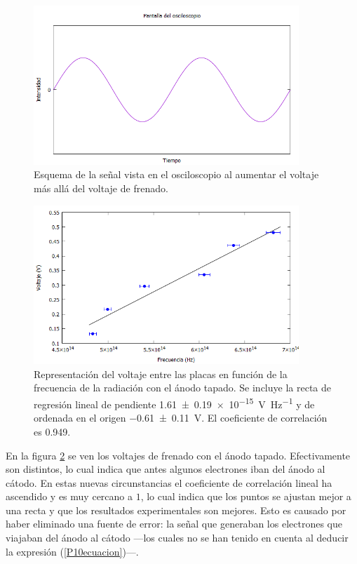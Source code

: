 \documentclass[12pt]{article}
\numberwithin{table}{section}
\numberwithin{figure}{section}
\numberwithin{equation}{section}
\newcommand{\data}[3]{\SI{#1 \pm #2}{#3}}
\begin{document}
\begin{figure}[!ht]
	\begin{center}
		\includegraphics[width=10cm]{P10Sinusoide.png}
		\caption{Esquema de la señal vista en el osciloscopio al aumentar el voltaje más allá del voltaje de frenado.}
		\label{P10sinusoide}
	\end{center}
\end{figure}
\begin{figure}[!ht]
	\begin{center}
		\includegraphics[width=10cm]{P10Anodotapado.png}
		\caption{Representación del voltaje entre las placas en función de la frecuencia de la radiación con el ánodo tapado. Se incluye la recta de regresión lineal de pendiente \data{1.61}{0.19e-15}{V Hz^{-1}} y de ordenada en el origen \data{-0.61}{0.11}{V}. El coeficiente de correlación es \num{0.949}.}
		\label{P10anodotapado}
	\end{center}
\end{figure}

En la figura \ref{P10anodotapado} se ven los voltajes de frenado con el ánodo tapado. Efectivamente son distintos, lo cual indica que antes algunos electrones iban del ánodo al cátodo. En estas nuevas circunstancias el coeficiente de correlación lineal ha ascendido y es muy cercano a $1$, lo cual indica que los puntos se ajustan mejor a una recta y que los resultados experimentales son mejores. Esto es causado por haber eliminado una fuente de error: la señal que generaban los electrones que viajaban del ánodo al cátodo ---los cuales no se han tenido en cuenta al deducir la expresión (\ref{P10ecuacion})---.
\end{document}
